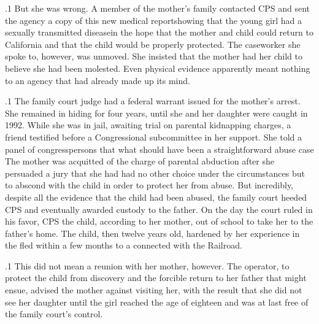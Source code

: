 \documentclass[11pt, twoside]{article}
\begin{document}
{\p.1{%
But she was wrong. A member of the mother's family contacted CPS
and sent the agency a copy of this new medical report\mdash{}showing that
the young girl had a sexually transmitted disease\mdash{}in the hope that the
mother and child could return to California and that the child would
be properly protected. The caseworker she spoke to, however, was unmoved. She insisted that the mother had  her child to
believe she had been molested. Even physical evidence apparently meant
nothing to an agency that had already made up its mind.
}%

\p.1{%
The family court judge had a federal warrant issued for the mother's
arrest. She remained in hiding for four years, until she and her daughter
were caught in 1992. While she was in jail, awaiting trial on parental kidnapping charges, a friend testified before a Congressional subcommittee
in her support. She told a panel of congresspersons that  what should have been a straightforward
abuse case 
The mother was acquitted of the charge of parental abduction after
she persuaded a jury that she had had no other choice under the
circumstances but to abscond with the child in order to protect her from abuse. But
incredibly, despite all the evidence that the child had been abused, the
family court heeded CPS and eventually awarded custody to the father.
On the day the court ruled in his favor, CPS  the child, according to her mother,  out of school to take her
to the father's home. The child, then twelve years old, hardened by her
experience in the  fled within a few months to
a  connected with the Railroad.
}%

\p.1{%
This did not mean a reunion with her mother, however. The  operator, to protect the child from discovery and the forcible
return to her father that might ensue, advised the mother against visiting her, with the result that she did not see her daughter until the girl
reached the age of eighteen and was at last free of the family court's
control.
}%

}
\end{document}
